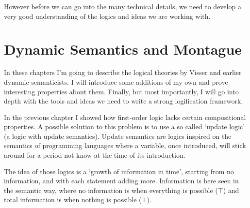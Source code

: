 \documentclass[12pt]{article}
\let\stdsection\section
\renewcommand\section{\newpage\stdsection}
\begin{document}
However before we can go into the many technical details, we need to develop a very good understanding of the logics and ideas we are working with.

\section{Dynamic Semantics and Montague}


In these chapters I'm going to describe the logical theories by Visser and earlier dynamic semanticists. I will introduce some additions of my own and prove interesting properties about them. Finally, but most importantly, I will go into depth with the tools and ideas we need to write a strong logification framework.

In the previous chapter I showed how first-order logic lacks certain compositional properties. A possible solution to this problem is to use a so called `update logic' (a logic with update semantics). Update semantics are logics inspired on the semantics of programming languages where a variable, once introduced, will stick around for a period not know at the time of its introduction.

The idea of those logics is a `growth of information in time', starting from no information, and with each statement adding more. Information is here seen in the semantic way, where no information is when everything is possible ($\top$) and total information is when nothing is possible ($\bot$).
\end{document}
